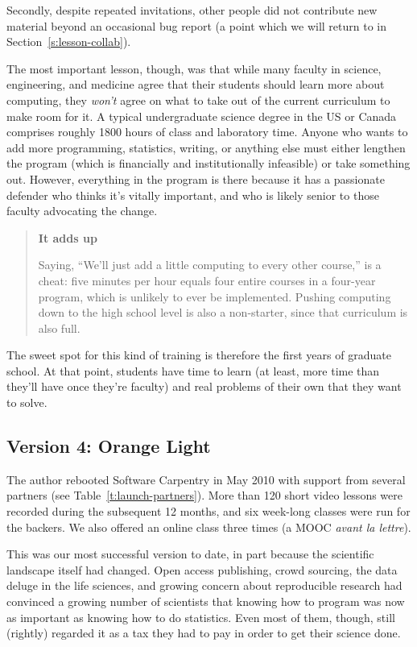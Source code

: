 \documentclass[10pt,a4paper,twocolumn]{article}
\begin{document}
Secondly, despite repeated invitations, other people did not
contribute new material beyond an occasional bug report (a point which
we will return to in Section~\ref{s:lesson-collab}).

The most important lesson, though, was that while many faculty in
science, engineering, and medicine agree that their students should
learn more about computing, they \emph{won't} agree on what to take
out of the current curriculum to make room for it. A typical
undergraduate science degree in the US or Canada comprises roughly
1800 hours of class and laboratory time. Anyone who wants to add more
programming, statistics, writing, or anything else must either
lengthen the program (which is financially and institutionally
infeasible) or take something out. However, everything in the program
is there because it has a passionate defender who thinks it's vitally
important, and who is likely senior to those faculty advocating the
change.

\begin{quote}
\textbf{It adds up}

Saying, ``We'll just add a little computing to every other course,'' is
a cheat: five minutes per hour equals four entire courses in a four-year
program, which is unlikely to ever be implemented. Pushing computing
down to the high school level is also a non-starter, since that
curriculum is also full.
\end{quote}

The sweet spot for this kind of training is therefore the first years
of graduate school. At that point, students have time to learn (at
least, more time than they'll have once they're faculty) and real
problems of their own that they want to solve.

\subsection{Version 4: Orange Light}

The author rebooted Software Carpentry in May 2010 with support from
several partners (see Table~\ref{t:launch-partners}). More than 120
short video lessons were recorded during the subsequent 12 months, and
six week-long classes were run for the backers. We also offered an
online class three times (a MOOC \emph{avant la lettre}).

This was our most successful version to date, in part because the
scientific landscape itself had changed. Open access publishing, crowd
sourcing, the data deluge in the life sciences, and growing concern
about reproducible research had convinced a growing number of
scientists that knowing how to program was now as important as knowing
how to do statistics.  Even most of them, though, still (rightly)
regarded it as a tax they had to pay in order to get their science
done.
\end{document}
